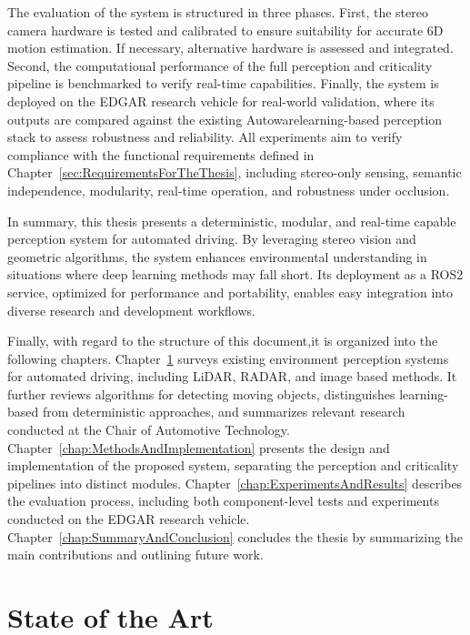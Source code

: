 The evaluation of the system is structured in three phases. First, the stereo
camera hardware is tested and calibrated to ensure suitability for accurate 6D
motion estimation. If necessary, alternative hardware is assessed and integrated.
Second, the computational performance of the full perception and criticality
pipeline is benchmarked to verify real-time capabilities.
Finally, the system is deployed on the EDGAR research vehicle for real-world
validation, where its outputs are compared against the existing Autowarelearning-based perception stack to
assess robustness and reliability. All experiments aim to verify compliance with
the functional requirements defined in Chapter~\ref{sec:RequirementsForTheThesis},
including stereo-only sensing, semantic independence, modularity, real-time
operation, and robustness under occlusion.

In summary, this thesis presents a deterministic, modular, and real-time capable 
perception system for automated driving. By leveraging stereo vision and geometric 
algorithms, the system enhances environmental understanding in situations where 
deep learning methods may fall short. Its deployment as a ROS2 service, optimized 
for performance and portability, enables easy integration into diverse research 
and development workflows.

Finally, with regard to the structure of this document,it is organized 
into the following chapters. Chapter~\ref{chap:StateOfTheArt} surveys existing 
environment perception systems for automated driving, including \gls{LiDAR}, \gls{RADAR}, 
and image based methods. It further reviews algorithms for detecting moving 
objects, distinguishes learning-based from deterministic approaches, and 
summarizes relevant research conducted at the Chair of Automotive Technology. 
Chapter~\ref{chap:MethodsAndImplementation} presents the design and 
implementation of the proposed system, separating the perception and criticality 
pipelines into distinct modules. Chapter~\ref{chap:ExperimentsAndResults} 
describes the evaluation process, including both component-level tests and 
experiments conducted on the EDGAR research vehicle. 
Chapter~\ref{chap:SummaryAndConclusion} concludes the thesis by 
summarizing the main contributions and outlining future work.


\chapter{State of the Art}\label{chap:StateOfTheArt}

